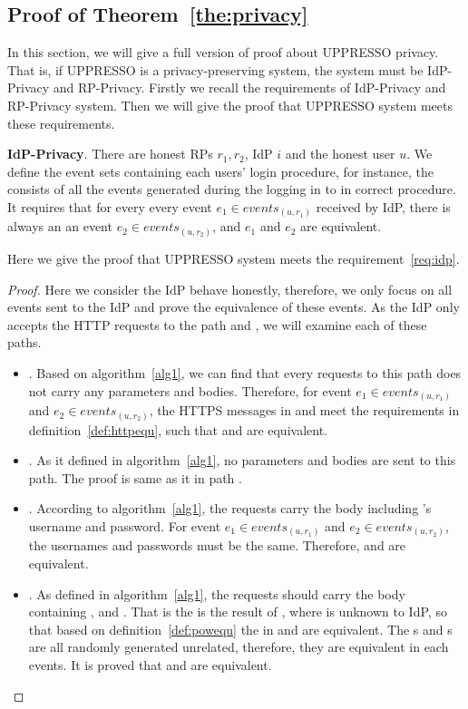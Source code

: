 \begin{appendices}
\subsection{Proof of Theorem~\ref{the:privacy}}
In this section, we will give a full version of proof about UPPRESSO privacy. That is, if UPPRESSO is a privacy-preserving system, the system must be IdP-Privacy and RP-Privacy. Firstly we recall the requirements of IdP-Privacy and RP-Privacy system. Then we will give the proof that UPPRESSO system meets these requirements. 
\begin{req}
\textbf{IdP-Privacy}. There are honest RPs $r_1, r_2$, IdP $i$ and the honest user $u$. We define the event sets containing each users' login procedure, for instance, the  consists of all the events generated during the  logging in to  in correct procedure. It requires that for every every event $e_1 \in events_{(u, r_1)}$ received by IdP, there is always an  an event $e_2 \in events_{(u, r_2)}$, and $e_1$ and $e_2$ are equivalent.
\label{req:idp}
\end{req}
Here we give the proof that UPPRESSO system meets the requirement~\ref{req:idp}.
\begin{proof}
Here we consider the IdP behave honestly, therefore, we only focus on all events sent to the IdP and prove the equivalence of these events. As the IdP only accepts the HTTP requests to the path  and , we will examine each of these paths.
\begin{itemize}
\item {}. Based on algorithm~\ref{alg1}, we can find that every requests to this path does not carry any parameters and bodies. Therefore, for event $e_1 \in events_{(u, r_1)}$ and $e_2 \in events_{(u, r_2)}$, the HTTPS messages in  and  meet the requirements in definition~\ref{def:httpequ}, such that  and  are equivalent.
\item {}. As it defined in algorithm~\ref{alg1}, no parameters and bodies are sent to this path. The proof is same as it in path . 
\item {}. According to  algorithm~\ref{alg1}, the requests carry the body including 's username and password. For event $e_1 \in events_{(u, r_1)}$ and $e_2 \in events_{(u, r_2)}$, the usernames and passwords must be the same. Therefore,  and  are equivalent. 
\item {}. As defined in algorithm~\ref{alg1}, the requests should carry the body containing ,  and . That is the  is the result of , where  is unknown to IdP, so that based on definition~\ref{def:powequ} the  in  and  are equivalent. The s and s are all randomly generated unrelated, therefore, they are equivalent in each events. It is proved that  and  are equivalent. 

\end{itemize}
\end{proof}
\end{appendices}
